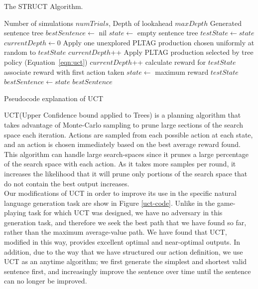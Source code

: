 \begin{algorithm}[t]
\caption{The STRUCT Algorithm.}\label{uct-code}
\begin{algorithmic}[1]
\REQUIRE Number of simulations $numTrials$, Depth of lookahead $maxDepth$
\ENSURE Generated sentence tree
\STATE $bestSentence \gets$ nil
\STATE $state \gets$ empty sentence tree
		\STATE $testState \gets state$
		\STATE $currentDepth \gets 0$
			\STATE Apply one unexplored PLTAG production chosen
                        uniformly at random to $testState$
			\STATE $currentDepth$++
		\ENDIF
			\STATE Apply PLTAG production selected by tree
                        policy (Equation~\ref{eqn:uct})
			\STATE $currentDepth$++
		\ENDWHILE
		\STATE calculate reward for $testState$
		\STATE associate reward with first action taken
	\ENDFOR
	\STATE $state \gets$ maximum reward $testState$
		\STATE $bestSentence \gets state$
	\ENDIF
\ENDWHILE
\ENDWHILE
\RETURN $bestSentence$
\end{algorithmic}
\caption{Pseudocode explanation of UCT}
\label{uct-code}
\end{algorithm}

UCT(Upper Confidence bound applied to Trees) \cite{kocsis_bandit_2006} is a planning algorithm that takes advantage of Monte-Carlo sampling to prune large sections of the search space each iteration.  Actions are sampled from each possible action at each state, and an action is chosen immediately based on the best average reward found.  This algorithm can handle large search-spaces since it prunes a large percentage of the search space with each action.  As it takes more samples per round, it increases the likelihood that it will prune only portions of the search space that do not contain the best output increases.\\

Our modifications of UCT in order to improve its use in the specific natural language generation task are show in Figure \ref{uct-code}.  Unlike in the game-playing task for which UCT was designed, we have no adversary in this generation task, and therefore we seek the best path that we have found so far, rather than the maximum average-value path.  We have found that UCT, modified in this way, provides excellent optimal and near-optimal outputs.  In addition, due to the way that we have structured our action definition, we use UCT as an anytime algorithm; we first generate the simplest and shortest valid sentence first, and increasingly improve the sentence over time until the sentence can no longer be improved.\\

